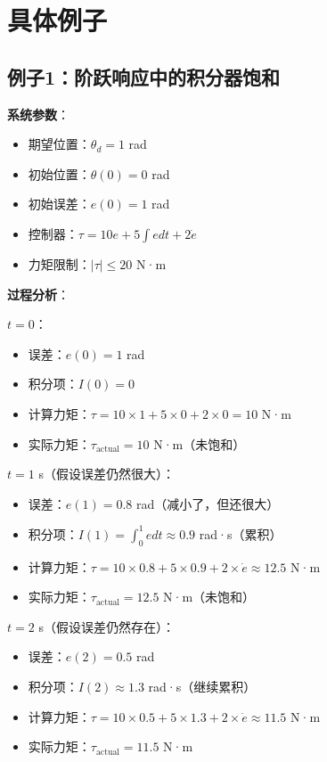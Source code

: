 \documentclass[12pt,a4paper]{article}
\begin{document}
\section{具体例子}

\subsection{例子1：阶跃响应中的积分器饱和}

\textbf{系统参数}：
\begin{itemize}
\item 期望位置：$\theta_d = 1$ rad
\item 初始位置：$\theta(0) = 0$ rad
\item 初始误差：$e(0) = 1$ rad
\item 控制器：$\tau = 10e + 5\int e dt + 2\dot{e}$
\item 力矩限制：$|\tau| \leq 20$ N·m
\end{itemize}

\textbf{过程分析}：

$t = 0$：
\begin{itemize}
\item 误差：$e(0) = 1$ rad
\item 积分项：$I(0) = 0$
\item 计算力矩：$\tau = 10 \times 1 + 5 \times 0 + 2 \times 0 = 10$ N·m
\item 实际力矩：$\tau_{\text{actual}} = 10$ N·m（未饱和）
\end{itemize}

$t = 1$ s（假设误差仍然很大）：
\begin{itemize}
\item 误差：$e(1) = 0.8$ rad（减小了，但还很大）
\item 积分项：$I(1) = \int_0^1 e dt \approx 0.9$ rad·s（累积）
\item 计算力矩：$\tau = 10 \times 0.8 + 5 \times 0.9 + 2 \times \dot{e} \approx 12.5$ N·m
\item 实际力矩：$\tau_{\text{actual}} = 12.5$ N·m（未饱和）
\end{itemize}

$t = 2$ s（假设误差仍然存在）：
\begin{itemize}
\item 误差：$e(2) = 0.5$ rad
\item 积分项：$I(2) \approx 1.3$ rad·s（继续累积）
\item 计算力矩：$\tau = 10 \times 0.5 + 5 \times 1.3 + 2 \times \dot{e} \approx 11.5$ N·m
\item 实际力矩：$\tau_{\text{actual}} = 11.5$ N·m
\end{itemize}
\end{document}
